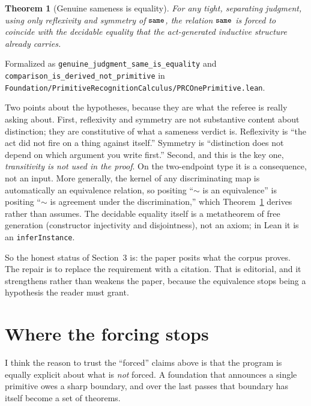 \documentclass[11pt,a4paper]{article}
\newtheorem{theorem}{Theorem}[section]
\theoremstyle{definition}
\theoremstyle{remark}
\newcommand{\code}[1]{\texttt{\small #1}}
\begin{document}
\begin{theorem}[Genuine sameness is equality]\label{thm:onequiv}
For any tight, separating judgment, using only reflexivity and symmetry of
$\code{same}$, the relation $\code{same}$ is forced to coincide with the
decidable equality that the act-generated inductive structure already carries.
\end{theorem}

Formalized as \code{genuine\_judgment\_same\_is\_equality} and
\code{comparison\_is\_derived\_not\_primitive} in
\code{Foundation/PrimitiveRecognitionCalculus/PRCOnePrimitive.lean}.

Two points about the hypotheses, because they are what the referee is really
asking about. First, reflexivity and symmetry are not substantive content about
distinction; they are constitutive of what a sameness verdict is. Reflexivity is
``the act did not fire on a thing against itself.'' Symmetry is ``distinction
does not depend on which argument you write first.'' Second, and this is the key
one, \emph{transitivity is not used in the proof}. On the two-endpoint type it is
a consequence, not an input. More generally, the kernel of any discriminating map
is automatically an equivalence relation, so positing ``$\sim$ is an
equivalence'' is positing ``$\sim$ is agreement under the discrimination,'' which
Theorem~\ref{thm:onequiv} derives rather than assumes. The decidable equality
itself is a metatheorem of free generation (constructor injectivity and
disjointness), not an axiom; in Lean it is an \code{inferInstance}.

So the honest status of Section~3 is: the paper posits what the corpus proves.
The repair is to replace the requirement with a citation. That is editorial, and
it strengthens rather than weakens the paper, because the equivalence stops being
a hypothesis the reader must grant.

\section{Where the forcing stops}\label{sec:boundary}

I think the reason to trust the ``forced'' claims above is that the program is
equally explicit about what is \emph{not} forced. A foundation that announces a
single primitive owes a sharp boundary, and over the last passes that boundary
has itself become a set of theorems.
\end{document}

